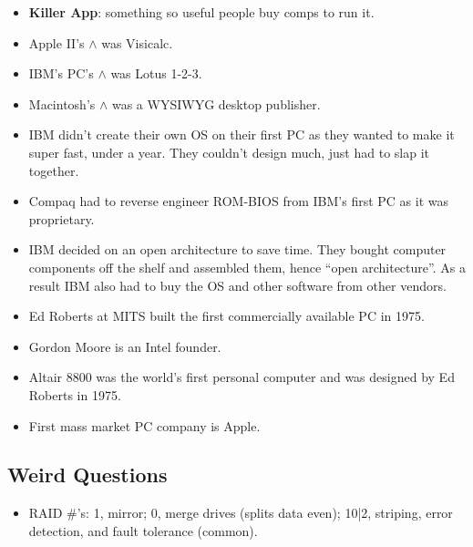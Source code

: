 \documentclass[fontsize=4.5pt]{scrartcl}
\begin{document}
\begin{multicols}{3}
\begin{itemize}
        \item \textbf{Killer App}: something so useful people buy comps to run it.
        \item Apple II's $\wedge$ was Visicalc.
        \item IBM's PC's $\wedge$ was Lotus 1-2-3.
        \item Macintosh's $\wedge$ was a WYSIWYG desktop publisher.
        \item IBM didn't create their own OS on their first PC as they wanted to make it super fast, under a year. They couldn't design much, just had to slap it together.
        \item Compaq had to reverse engineer ROM-BIOS from IBM's first PC as it was proprietary.
        \item IBM decided on an open architecture to save time. They bought computer components off the shelf and assembled them, hence ``open architecture''. As a result IBM
              also had to buy the OS and other software from other vendors.
        \item Ed Roberts at MITS built the first commercially available PC in 1975.
        \item Gordon Moore is an Intel founder.
        \item Altair 8800 was the world's first personal computer and was designed by Ed Roberts in 1975.
        \item First mass market PC company is Apple.
      \end{itemize}
     
     
     \subsection{Weird Questions}
       \begin{itemize}
         \item RAID \#'s: 1, mirror; 0, merge drives (splits data even); 10|2, striping, error detection, and fault tolerance (common).
       \end{itemize}




  \end{multicols}
\end{document}
